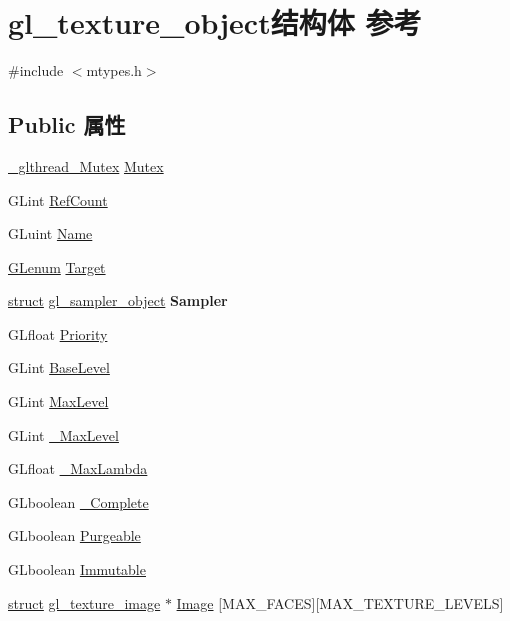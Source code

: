 \hypertarget{structgl__texture__object}{}\section{gl\+\_\+texture\+\_\+object结构体 参考}
\label{structgl__texture__object}


{\ttfamily \#include $<$mtypes.\+h$>$}

\subsection*{Public 属性}
\begin{DoxyCompactItemize}
\item 
\hyperlink{struct___c_r_i_t_i_c_a_l___s_e_c_t_i_o_n}{\+\_\+glthread\+\_\+\+Mutex} \hyperlink{structgl__texture__object_a8361ee74ffc4aaba6fe3792faa0294ad}{Mutex}
\item 
G\+Lint \hyperlink{structgl__texture__object_a78dfddfbf7e845fbeb3c44bf59b485a5}{Ref\+Count}
\item 
G\+Luint \hyperlink{structgl__texture__object_a4b72cb90927d19cec4ce0818b97f151b}{Name}
\item 
\hyperlink{interfacevoid}{G\+Lenum} \hyperlink{structgl__texture__object_ad318d8ec752261c1ccb25ce020c74ad9}{Target}
\item 
\mbox{\label{structgl__texture__object_a85c79b9b5dad17f284ec2d220d9e37d9}} 
\hyperlink{interfacestruct}{struct} \hyperlink{structgl__sampler__object}{gl\+\_\+sampler\+\_\+object} {\bfseries Sampler}
\item 
G\+Lfloat \hyperlink{structgl__texture__object_a0a11b05b539c16da0090267451de8a4d}{Priority}
\item 
G\+Lint \hyperlink{structgl__texture__object_a69a0a5ac318673294a282449e2f4b02a}{Base\+Level}
\item 
G\+Lint \hyperlink{structgl__texture__object_a1d502eafcd683d735456c0ff4c653bbd}{Max\+Level}
\item 
G\+Lint \hyperlink{structgl__texture__object_aaf01f491682aac2db3dc1417ddfa527c}{\+\_\+\+Max\+Level}
\item 
G\+Lfloat \hyperlink{structgl__texture__object_ae315f20a1c1bb421e08caf36f8d264d5}{\+\_\+\+Max\+Lambda}
\item 
G\+Lboolean \hyperlink{structgl__texture__object_a5397cbf028463c9663a567daba1d5e10}{\+\_\+\+Complete}
\item 
G\+Lboolean \hyperlink{structgl__texture__object_a2d7a0f721e3c73401fe7a3ebf44287b9}{Purgeable}
\item 
G\+Lboolean \hyperlink{structgl__texture__object_afb2245acefd356aff0d9951bbbcc3b57}{Immutable}
\item 
\hyperlink{interfacestruct}{struct} \hyperlink{structgl__texture__image}{gl\+\_\+texture\+\_\+image} $\ast$ \hyperlink{structgl__texture__object_ad63857c05f285d1d6b19b6dbe660f892}{Image} \mbox{[}M\+A\+X\+\_\+\+F\+A\+C\+ES\mbox{]}\mbox{[}M\+A\+X\+\_\+\+T\+E\+X\+T\+U\+R\+E\+\_\+\+L\+E\+V\+E\+LS\mbox{]}
\end{DoxyCompactItemize}


